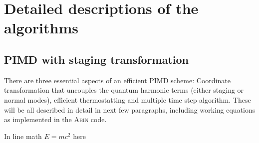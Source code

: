\section{Detailed descriptions of the algorithms}
\subsection{PIMD with staging transformation}
There are three essential aspects of an efficient PIMD scheme: Coordinate transformation that uncouples the quantum harmonic terms (either staging or normal modes), efficient thermostatting and multiple time step algorithm. These will be all described in detail in next few paragraphs, including working equations as implemented in the \textsc{Abin} code.

In line math $E=mc^2$ here

\begin{equation}
    \label{eq:cjskld}
\end{equation}

